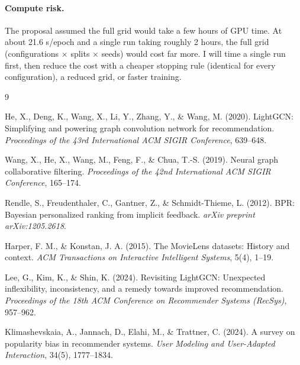 \documentclass{article}
\begin{document}
\paragraph{Compute risk.} The proposal assumed the full grid would take a few hours of GPU time. At about 21.6 s/epoch and a single run taking roughly 2 hours, the full grid (configurations $\times$ splits $\times$ seeds) would cost far more. I will time a single run first, then reduce the cost with a cheaper stopping rule (identical for every configuration), a reduced grid, or faster training.


\begin{thebibliography}{9}

He, X., Deng, K., Wang, X., Li, Y., Zhang, Y., \& Wang, M. (2020).
LightGCN: Simplifying and powering graph convolution network for recommendation.
\textit{Proceedings of the 43rd International ACM SIGIR Conference}, 639--648.

Wang, X., He, X., Wang, M., Feng, F., \& Chua, T.-S. (2019).
Neural graph collaborative filtering.
\textit{Proceedings of the 42nd International ACM SIGIR Conference}, 165--174.

Rendle, S., Freudenthaler, C., Gantner, Z., \& Schmidt-Thieme, L. (2012).
BPR: Bayesian personalized ranking from implicit feedback.
\textit{arXiv preprint arXiv:1205.2618}.

Harper, F. M., \& Konstan, J. A. (2015).
The MovieLens datasets: History and context.
\textit{ACM Transactions on Interactive Intelligent Systems}, 5(4), 1--19.

Lee, G., Kim, K., \& Shin, K. (2024).
Revisiting LightGCN: Unexpected inflexibility, inconsistency, and a remedy towards improved recommendation.
\textit{Proceedings of the 18th ACM Conference on Recommender Systems (RecSys)}, 957--962.

Klimashevskaia, A., Jannach, D., Elahi, M., \& Trattner, C. (2024).
A survey on popularity bias in recommender systems.
\textit{User Modeling and User-Adapted Interaction}, 34(5), 1777--1834.

\end{thebibliography}
\end{document}
